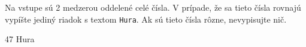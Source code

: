 




Na vstupe sú 2 medzerou oddelené celé čísla. V prípade, že sa tieto čísla rovnajú vypíšte jediný riadok s textom \texttt{Hura}.
Ak sú tieto čísla rôzne, nevypisujte nič.

 47
\vystup
Hura
\koniec


